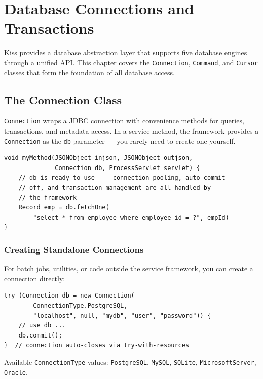 \chapter{Database Connections and Transactions}
\label{ch:db-connection}

Kiss provides a database abstraction layer that supports five database engines through a unified API.  This chapter covers the \texttt{Connection}, \texttt{Command}, and \texttt{Cursor} classes that form the foundation of all database access.

\section{The Connection Class}
\label{sec:db-connection}

\texttt{Connection} wraps a JDBC connection with convenience methods for queries, transactions, and metadata access.  In a service method, the framework provides a \texttt{Connection} as the \texttt{db} parameter --- you rarely need to create one yourself.

\begin{lstlisting}[style=groovy]
void myMethod(JSONObject injson, JSONObject outjson,
              Connection db, ProcessServlet servlet) {
    // db is ready to use --- connection pooling, auto-commit
    // off, and transaction management are all handled by
    // the framework
    Record emp = db.fetchOne(
        "select * from employee where employee_id = ?", empId)
}
\end{lstlisting}

\subsection{Creating Standalone Connections}

For batch jobs, utilities, or code outside the service framework, you can create a connection directly:

\begin{lstlisting}[style=java]
try (Connection db = new Connection(
        ConnectionType.PostgreSQL,
        "localhost", null, "mydb", "user", "password")) {
    // use db ...
    db.commit();
}  // connection auto-closes via try-with-resources
\end{lstlisting}

\noindent
Available \texttt{ConnectionType} values: \texttt{PostgreSQL}, \texttt{MySQL}, \texttt{SQLite}, \texttt{MicrosoftServer}, \texttt{Oracle}.

